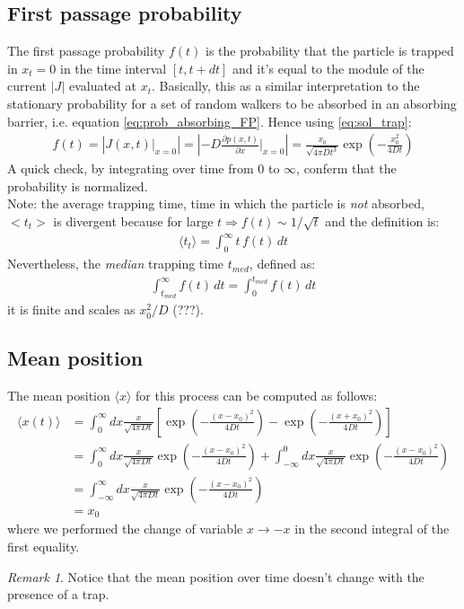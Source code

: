 \documentclass[4apaper,11pt,fleqn]{article}
\theoremstyle{remark}
\newtheorem*{rem}{Remark}
\theoremstyle{definition}
\begin{document}
\subsection{First passage probability}
The first passage probability $f(t)$ is the probability that the particle is trapped in $x_t=0$ in the time interval $[t,t+dt]$ and it's equal to the module of the current $|J|$ evaluated at $x_t$.
Basically, this as a similar interpretation to the stationary probability for a set of random walkers to be absorbed in an absorbing barrier, i.e. equation \eqref{eq:prob_absorbing_FP}.
Hence using \eqref{eq:sol_trap}:
\begin{align*}
  f (t) = \left|  J(x,t) \Bigr|_{x=0} \right| = \left|  -D \frac{\partial p(x,t)}{\partial x}\Bigr|_{x=0} \right| = \frac{x_{0}}{\sqrt{4 \pi D t^{3}}} \exp \left(-\frac{x_{0}^{2}}{4 D t}\right)
\end{align*}
A quick check, by integrating over time from 0 to $\infty$, conferm that the probability is normalized. \\
Note: the average trapping time, time in which the particle is \emph{not} absorbed, $<t_t>$ is divergent because for large $t \Rightarrow f(t) \sim 1/\sqrt{t}$ and the definition is:
\begin{align*}
  \langle t_t \rangle = \int_0^\infty t \, f(t) \, dt
\end{align*}
Nevertheless,  the \emph{median} trapping time $t_{med}$, defined as:
\begin{align*}
  \int_{t_{med}}^\infty f(t)\, dt = \int_0^{t_{med}} f(t) \, dt
\end{align*}
it is finite and scales as $x_0^2/D$ (???).

\subsection{Mean position}
The mean position $\langle x \rangle$ for this process can be computed as follows:
\begin{align*}
  \langle x(t)\rangle &= \int_{0}^{\infty} d x \frac{x}{\sqrt{4 \pi D t}}\left[\exp \left(-\frac{\left(x-x_{0}\right)^{2}}{4 D t}\right)-\exp \left(-\frac{\left(x+x_{0}\right)^{2}}{4 D t}\right)\right] \\
                      &= \int_{0}^{\infty} d x \frac{x}{\sqrt{4 \pi D t}} \exp \left(-\frac{\left(x-x_{0}\right)^{2}}{4 D t}\right)+\int_{-\infty}^{0} d x \frac{x}{\sqrt{4 \pi D t}} \exp \left(-\frac{\left(x-x_{0}\right)^{2}}{4 D t}\right) \\
                      &= \int_{-\infty}^{\infty} d x \frac{x}{\sqrt{4 \pi D t}} \exp \left(-\frac{\left(x-x_{0}\right)^{2}}{4 D t}\right) \\
                      &= x_0
\end{align*}
where we performed the change of variable $x \rightarrow -x$ in the second integral of the first equality.
\begin{rem}
  Notice that the mean position over time doesn't change with the presence of a trap.
\end{rem}
\end{document}

